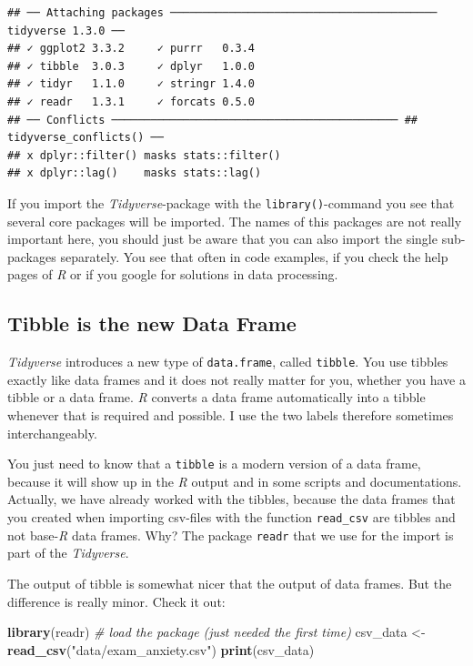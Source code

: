 \documentclass[
]{scrartcl}
\newenvironment{Shaded}{\begin{snugshade}}{\end{snugshade}}
\newcommand{\CommentTok}[1]{\textcolor[rgb]{0.56,0.35,0.01}{\textit{#1}}}
\newcommand{\FunctionTok}[1]{\textcolor[rgb]{0.13,0.29,0.53}{\textbf{#1}}}
\newcommand{\NormalTok}[1]{#1}
\newcommand{\OtherTok}[1]{\textcolor[rgb]{0.56,0.35,0.01}{#1}}
\newcommand{\StringTok}[1]{\textcolor[rgb]{0.31,0.60,0.02}{#1}}
\begin{document}
\begin{verbatim}
## ── Attaching packages ───────────────────────────────────────── tidyverse 1.3.0 ──
## ✓ ggplot2 3.3.2     ✓ purrr   0.3.4
## ✓ tibble  3.0.3     ✓ dplyr   1.0.0
## ✓ tidyr   1.1.0     ✓ stringr 1.4.0
## ✓ readr   1.3.1     ✓ forcats 0.5.0
## ── Conflicts ──────────────────────────────────────────── ## tidyverse_conflicts() ──
## x dplyr::filter() masks stats::filter()
## x dplyr::lag()    masks stats::lag()
\end{verbatim}

If you import the \emph{Tidyverse}-package with the \texttt{library()}-command you see that several core packages will be imported. The names of this packages are not really important here, you should just be aware that you can also import the single sub-packages separately. You see that often in code examples, if you check the help pages of \emph{R} or if you google for solutions in data processing.

\subsection{Tibble is the new Data Frame}\label{tibble-is-the-new-data-frame}

\emph{Tidyverse} introduces a new type of \texttt{data.frame}, called \texttt{tibble}. You use tibbles exactly like data frames and it does not really matter for you, whether you have a tibble or a data frame. \emph{R} converts a data frame automatically into a tibble whenever that is required and possible. I use the two labels therefore sometimes interchangeably.

You just need to know that a \texttt{tibble} is a modern version of a data frame, because it will show up in the \emph{R} output and in some scripts and documentations. Actually, we have already worked with the tibbles, because the data frames that you created when importing csv-files with the function \texttt{read\_csv} are tibbles and not base-\emph{R} data frames. Why? The package \texttt{readr} that we use for the import is part of the \emph{Tidyverse}.

The output of tibble is somewhat nicer that the output of data frames. But the difference is really minor. Check it out:

\begin{Shaded}
\begin{Highlighting}[]
\FunctionTok{library}\NormalTok{(readr) }\CommentTok{\# load the package (just needed the first time)}
\NormalTok{csv\_data }\OtherTok{\textless{}{-}} \FunctionTok{read\_csv}\NormalTok{(}\StringTok{"data/exam\_anxiety.csv"}\NormalTok{)}
\FunctionTok{print}\NormalTok{(csv\_data)}
\end{Highlighting}
\end{Shaded}
\end{document}
